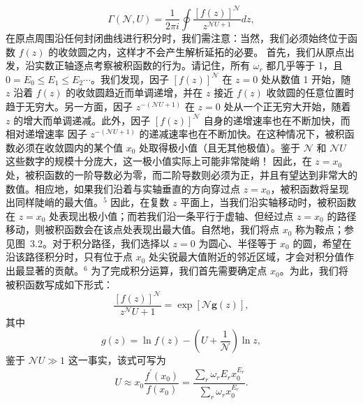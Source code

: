 \begin{equation}\tag{3.2.20}\label{eq:3.2.20}
\Gamma ( \mathcal { N } , U ) = \frac { 1 } { 2 \pi i } \oint \frac { [ f ( z ) ] ^{\mathcal { N} } } { z ^{\mathcal { N} U + 1 } } d z ,
\end{equation}
在原点周围沿任何封闭曲线进行积分时，我们需注意：当然，我们必须始终位于函数 \(f(z)\) 的收敛圆之内，这样才不会产生解析延拓的必要。
首先，我们从原点出发，沿实数正轴逐点考察被积函数的行为。请记住，所有 \(\omega_{r}\) 都几乎等于 1，且 \(0 = E_{0} \leq E_{1} \leq E_{2} \cdots\)。我们发现，因子 \([f(z)]^{\mathcal{N}}\) 在 \(z=0\) 处从数值 1 开始，随 \(z\) 沿着 \(f(z)\) 的收敛圆趋近而单调递增，并在 \(z\) 接近 \(f(z)\) 收敛圆的任意位置时趋于无穷大。另一方面，因子 \(z^{-(\mathcal{N}U+1)}\) 在 \(z=0\) 处从一个正无穷大开始，随着 \(z\) 的增大而单调递减。此外，因子 \([f(z)]^{\mathcal{N}}\) 自身的递增速率也在不断加快，而相对递增速率
因子 \(z^{-(\mathcal{N}U+1)}\) 的递减速率也在不断加快。在这种情况下，被积函数必须在收敛圆内的某个值 \(x_0\) 处取得极小值（且无其他极值）。鉴于 \(\mathcal{N}\) 和 \(\mathcal{N}U\) 这些数字的规模十分庞大，这一极小值实际上可能非常陡峭！
因此，在 \(z=x_{0}\) 处，被积函数的一阶导数必为零，而二阶导数则必须为正，并且有望达到非常大的数值。相应地，如果我们沿着与实轴垂直的方向穿过点 \(z=x_{0}\)，被积函数将呈现出同样陡峭的最大值。\(^{5}\) 因此，在复数 \(z\) 平面上，当我们沿实轴移动时，被积函数在 \(z=x_{0}\) 处表现出极小值；而若我们沿一条平行于虚轴、但经过点 \(z=x_{0}\) 的路径移动，则被积函数会在该点处表现出最大值。自然地，我们将点 \(x_{0}\) 称为鞍点；参见图~3.2。对于积分路径，我们选择以 \(z=0\) 为圆心、半径等于 \(x_{0}\) 的圆，希望在沿该路径积分时，只有位于点 \(x_{0}\) 处尖锐最大值附近的邻近区域，才会对积分值作出最显著的贡献。\(^{6}\)
为了完成积分运算，我们首先需要确定点 \(x_0\)。为此，我们将被积函数写成如下形式：
\begin{equation}\tag{3.2.21}\label{eq:3.2.21}
\frac { [ f ( z ) ] ^{\mathcal { N} } } { z ^{\mathcal { N} } U + 1 } = \exp [ \mathcal { N } \mathbf { g } ( z ) ] ,
\end{equation}
其中
\begin{equation}\tag{3.2.22}\label{eq:3.2.22}
g ( z ) = \ln f ( z ) - \left( U + \frac { 1 } { \mathcal { N } } \right) \ln z ,
\end{equation}
鉴于 \(\mathcal{N}U\gg1\) 这一事实，该式可写为
\begin{equation}\tag{3.2.23}\label{eq:3.2.23}
U \approx x _ { 0 } \frac { f ^{\prime} ( x _ { 0 } ) } { f ( x _ { 0 } ) } = \frac { \sum _ { r } \omega _ { r } E _ { r } x _ { 0 } ^{E _ { r} } } { \sum _ { r } \omega _ { r } x _ { 0 } ^{E _ { r} } } .
\end{equation}

